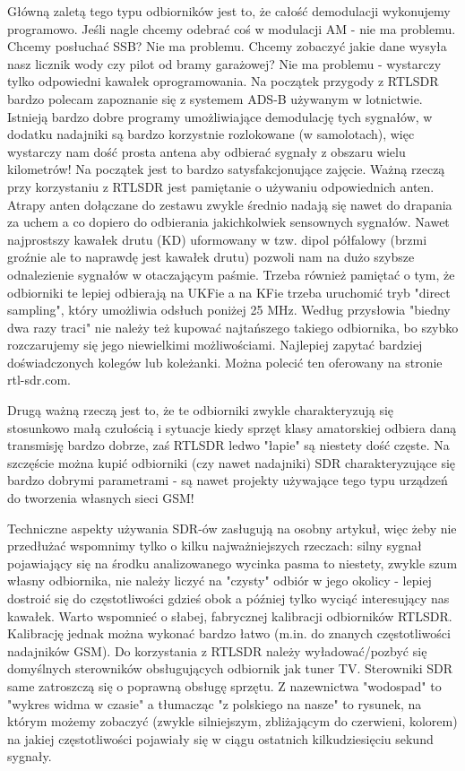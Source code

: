 \documentclass[a4paper,12pt]{article}
\begin{document}
Główną zaletą tego typu odbiorników jest to, że całość demodulacji wykonujemy programowo. Jeśli nagle chcemy odebrać coś w modulacji AM - nie ma problemu. Chcemy posłuchać SSB? Nie ma problemu. Chcemy zobaczyć jakie dane wysyła nasz licznik wody czy pilot od bramy garażowej? Nie ma problemu - wystarczy tylko odpowiedni kawałek oprogramowania.
Na początek przygody z RTLSDR bardzo polecam zapoznanie się z systemem ADS-B używanym w lotnictwie. Istnieją bardzo dobre programy umożliwiające demodulację tych sygnałów, w dodatku nadajniki są bardzo korzystnie rozlokowane (w samolotach), więc wystarczy nam dość prosta antena aby odbierać sygnały z obszaru wielu kilometrów! Na początek jest to bardzo satysfakcjonujące zajęcie.
Ważną rzeczą przy korzystaniu z RTLSDR jest pamiętanie o używaniu odpowiednich anten. Atrapy anten dołączane do zestawu zwykle średnio nadają się nawet do drapania za uchem a co dopiero do odbierania jakichkolwiek sensownych sygnałów. Nawet najprostszy kawałek drutu (KD) uformowany w tzw. dipol półfalowy (brzmi groźnie ale to naprawdę jest kawałek drutu) pozwoli nam na dużo szybsze odnalezienie sygnałów w otaczającym paśmie.
Trzeba również pamiętać o tym, że odbiorniki te lepiej odbierają na UKFie a na KFie trzeba uruchomić tryb "direct sampling", który umożliwia odsłuch poniżej 25 MHz.
Według przysłowia "biedny dwa razy traci" nie należy też kupować najtańszego takiego odbiornika, bo szybko rozczarujemy się jego niewielkimi możliwościami. Najlepiej zapytać bardziej doświadczonych kolegów lub koleżanki.
Można polecić ten oferowany na stronie rtl-sdr.com. 

Drugą ważną rzeczą jest to, że te odbiorniki zwykle charakteryzują się stosunkowo małą czułością i sytuacje kiedy sprzęt klasy amatorskiej odbiera daną transmisję bardzo dobrze, zaś RTLSDR ledwo "łapie" są niestety dość częste. Na szczęście można kupić odbiorniki (czy nawet nadajniki) SDR charakteryzujące się bardzo dobrymi parametrami - są nawet projekty używające tego typu urządzeń do tworzenia własnych sieci GSM!

Techniczne aspekty używania SDR-ów zasługują na osobny artykuł, więc żeby nie przedłużać wspomnimy tylko o kilku najważniejszych rzeczach: silny sygnał pojawiający się na środku analizowanego wycinka pasma to niestety, zwykle szum własny odbiornika, nie należy liczyć na "czysty" odbiór w jego okolicy - lepiej dostroić się do częstotliwości gdzieś obok a później tylko wyciąć interesujący nas kawałek. Warto wspomnieć o słabej, fabrycznej kalibracji odbiorników RTLSDR. Kalibrację jednak można wykonać bardzo łatwo (m.in. do znanych częstotliwości nadajników GSM). Do korzystania z RTLSDR należy wyładować/pozbyć się domyślnych sterowników obsługujących odbiornik jak tuner TV. Sterowniki SDR same zatroszczą się o poprawną obsługę sprzętu.
Z nazewnictwa "wodospad" to "wykres widma w czasie" a tłumacząc "z polskiego na nasze" to rysunek, na którym możemy zobaczyć (zwykle silniejszym, zbliżającym do czerwieni, kolorem) na jakiej częstotliwości pojawiały się w ciągu ostatnich kilkudziesięciu sekund sygnały.
\end{document}
